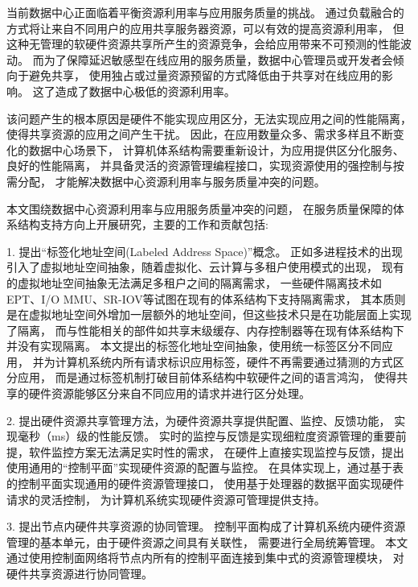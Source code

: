 \begin{cabstract}
  当前数据中心正面临着平衡资源利用率与应用服务质量的挑战。
  通过负载融合的方式将让来自不同用户的应用共享服务器资源，可以有效的提高资源利用率，
  但这种无管理的软硬件资源共享所产生的资源竞争，会给应用带来不可预测的性能波动。
  而为了保障延迟敏感型在线应用的服务质量，数据中心管理员或开发者会倾向于避免共享，
  使用独占或过量资源预留的方式降低由于共享对在线应用的影响。
  这了造成了数据中心极低的资源利用率。

  该问题产生的根本原因是硬件不能实现应用区分，无法实现应用之间的性能隔离，
  使得共享资源的应用之间产生干扰。
  因此，在应用数量众多、需求多样且不断变化的数据中心场景下，
  计算机体系结构需要重新设计，为应用提供区分化服务、良好的性能隔离，
  并具备灵活的资源管理编程接口，实现资源使用的强控制与按需分配，
  才能解决数据中心资源利用率与服务质量冲突的问题。

  本文围绕数据中心资源利用率与应用服务质量冲突的问题，
  在服务质量保障的体系结构支持方向上开展研究，主要的工作和贡献包括:

  1. 提出``标签化地址空间(Labeled Address Space)''概念。
     正如多进程技术的出现引入了虚拟地址空间抽象，随着虚拟化、云计算与多租户使用模式的出现，
     现有的虚拟地址空间抽象无法满足多租户之间的隔离需求，
     一些硬件隔离技术如EPT、I/O MMU、SR-IOV等试图在现有的体系结构下支持隔离需求，
     其本质则是在虚拟地址空间外增加一层额外的地址空间，但这些技术只是在功能层面上实现了隔离，
     而与性能相关的部件如共享末级缓存、内存控制器等在现有体系结构下并没有实现隔离。
     本文提出的标签化地址空间抽象，使用统一标签区分不同应用，
     并为计算机系统内所有请求标识应用标签，硬件不再需要通过猜测的方式区分应用，
     而是通过标签机制打破目前体系结构中软硬件之间的语言鸿沟，
     使得共享的硬件资源能够区分来自不同应用的请求并进行区分处理。

  2. 提出硬件资源共享管理方法，为硬件资源共享提供配置、监控、反馈功能，
     实现毫秒（ms）级的性能反馈。
     实时的监控与反馈是实现细粒度资源管理的重要前提，软件监控方案无法满足实时性的需求，
     在硬件上直接实现监控与反馈，提出使用通用的``控制平面''实现硬件资源的配置与监控。
     在具体实现上，通过基于表的控制平面实现通用的硬件资源管理接口，
     使用基于处理器的数据平面实现硬件请求的灵活控制，
     为计算机系统实现硬件资源可管理提供支持。

  3. 提出节点内硬件共享资源的协同管理。
     控制平面构成了计算机系统内硬件资源管理的基本单元，由于硬件资源之间具有关联性，
     需要进行全局统筹管理。
     本文通过使用控制面网络将节点内所有的控制平面连接到集中式的资源管理模块，
     对硬件共享资源进行协同管理。
\end{cabstract}

